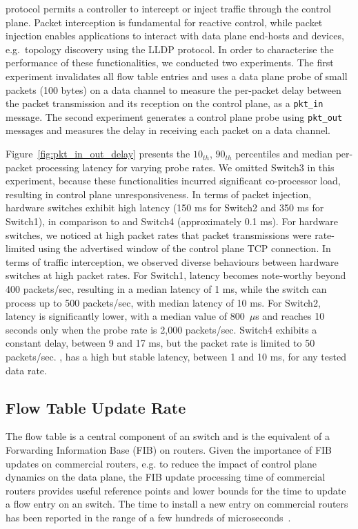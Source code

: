 \of protocol permits a controller to intercept or inject traffic through the
control plane. Packet interception is fundamental for reactive control, while
packet injection enables applications to interact with data plane end-hosts and
devices, e.g.~topology discovery using the LLDP protocol.  In order to
characterise the performance of these functionalities, we conducted two
experiments.  The first experiment invalidates all flow table entries and uses a
data plane probe of small packets (100 bytes) on a data channel to  measure the
per-packet delay between the packet transmission and its reception on the
control plane, as a \texttt{pkt\_in} message. The second experiment generates a
control plane probe using \texttt{pkt\_out} messages and measures the delay in
receiving each packet on a data channel.  

Figure~\ref{fig:pkt_in_out_delay} presents the $10_{th}$, $90_{th}$ percentiles and
median per-packet processing latency for varying probe rates. We omitted Switch3 in
this experiment, because these functionalities incurred significant co-processor
load, resulting in control plane unresponsiveness.  In terms of packet
injection, hardware switches exhibit high latency (150 ms for Switch2 and 350
ms for Switch1), in comparison to \ovs and Switch4 (approximately 0.1 ms).
For hardware switches, we noticed at high packet rates that packet
transmissions were rate-limited using the advertised window of the control plane
TCP connection. In terms of traffic interception, we observed diverse behaviours
between hardware switches at high packet rates. For Switch1, latency becomes
note-worthy beyond 400 packets/sec, resulting in a median latency of 1 ms,
while the switch can process up to 500 packets/sec, with median latency of 10
ms. For Switch2, latency is significantly lower, with a median value of
800~$\mu$s and reaches 10 seconds only when the probe rate is 2,000
packets/sec. Switch4 exhibits a constant delay, between 9 and 17 ms, but the
packet rate is limited to 50 packets/sec.  \ovs, has a high but stable latency,
between 1 and 10 ms, for any tested data rate. 

\subsection{Flow Table Update Rate}\label{sec:results-rate}

The flow table is a central component of an \of switch and is the equivalent of
a Forwarding Information Base (FIB) on routers. Given the importance of FIB
updates on commercial routers, e.g. to reduce the impact of control plane
dynamics on the data plane, the FIB update processing time of commercial routers
provides useful reference points and lower bounds for the time to update a flow
entry on an \of switch. The time to install a new entry on commercial routers
has been reported in the range of a few hundreds of
microseconds~.


